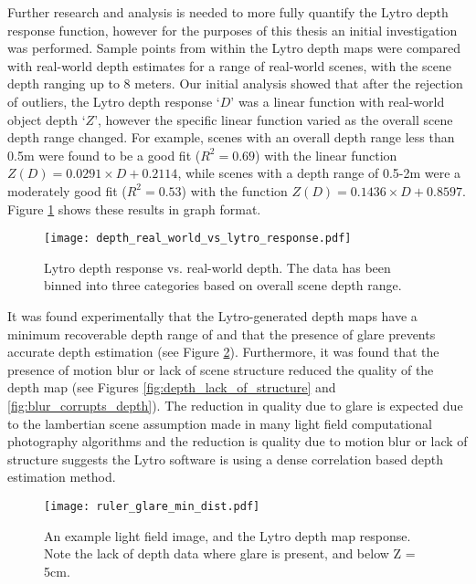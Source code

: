 Further research and analysis is needed to more fully quantify the Lytro depth response function, however for the purposes of this thesis an initial investigation was performed.
Sample points from within the Lytro depth maps were compared with real-world depth estimates for a range of real-world scenes, with the scene depth ranging up to 8 meters.
Our initial analysis showed that after the rejection of outliers, the Lytro depth response \enquote*{$D$} was a linear function with real-world object depth \enquote*{$Z$}, however the specific linear function varied as the overall scene depth range changed.
For example, scenes with an overall depth range less than 0.5m were found to be a good fit ($R^2 = 0.69$) with the linear function $Z(D) = 0.0291 \times D + 0.2114$, while scenes with a depth range of 0.5-2m were a moderately good fit ($R^2 = 0.53$) with the function $Z(D) = 0.1436 \times D + 0.8597$.
Figure \ref{fig:depth_real_world_vs_lytro_response} shows these results in graph format.

\begin{figure}[h]
\centering
\caption[Lytro depth response vs. real-world depth]{Lytro depth response vs. real-world depth. The data has been binned into three categories based on overall scene depth range.}
\label{fig:depth_real_world_vs_lytro_response}
\texttt{[image: depth\_real\_world\_vs\_lytro\_response.pdf]}
\end{figure}

It was found experimentally that the Lytro-generated depth maps have a minimum recoverable depth range of  and that the presence of glare prevents accurate depth estimation (see Figure \ref{fig:ruler_glare_min_dist}).
Furthermore, it was found that the presence of motion blur or lack of scene structure reduced the quality of the depth map (see Figures \ref{fig:depth_lack_of_structure} and \ref{fig:blur_corrupts_depth}).
The reduction in quality due to glare is expected due to the lambertian scene assumption made in many light field computational photography algorithms \cite{bishop2009light, liang2011light, baker2003shape} and the reduction is quality due to motion blur or lack of structure suggests the Lytro software is using a dense correlation based depth estimation method.


\begin{figure}
\centering
\texttt{[image: ruler\_glare\_min\_dist.pdf]}
\caption[Minimum depth map distance and the effect of glare]{An example light field image, and the Lytro depth map response. Note the lack of depth data where glare is present, and below Z = 5cm.}
\label{fig:ruler_glare_min_dist}
\end{figure}

